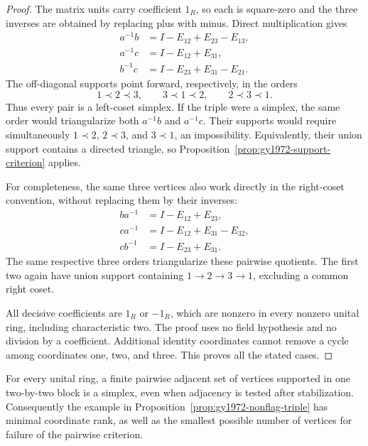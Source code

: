 \begin{proof}
The matrix units carry coefficient \(1_R\), so each is square-zero and
the three inverses are obtained by replacing plus with minus. Direct
multiplication gives
\[
\begin{aligned}
 a^{-1}b&=I-E_{12}+E_{23}-E_{13},\\
 a^{-1}c&=I-E_{12}+E_{31},\\
 b^{-1}c&=I-E_{23}+E_{31}-E_{21}.
\end{aligned}
\]
The off-diagonal supports point forward, respectively, in the orders
\[
             1\prec2\prec3,\qquad
             3\prec1\prec2,\qquad
             2\prec3\prec1.
\]
Thus every pair is a left-coset simplex. If the triple were a simplex,
the same order would triangularize both \(a^{-1}b\) and \(a^{-1}c\).
Their supports would require simultaneously
\(1\prec2\), \(2\prec3\), and \(3\prec1\), an impossibility.
Equivalently, their union support contains a directed triangle, so
Proposition~\ref{prop:gy1972-support-criterion} applies.

For completeness, the same three vertices also work directly in the
right-coset convention, without replacing them by their inverses:
\[
\begin{aligned}
 ba^{-1}&=I-E_{12}+E_{23},\\
 ca^{-1}&=I-E_{12}+E_{31}-E_{32},\\
 cb^{-1}&=I-E_{23}+E_{31}.
\end{aligned}
\]
The same respective three orders triangularize these pairwise
quotients. The first two again have union support containing
\(1\to2\to3\to1\), excluding a common right coset.

All decisive coefficients are \(1_R\) or \(-1_R\), which are nonzero
in every nonzero unital ring, including characteristic two. The proof
uses no field hypothesis and no division by a coefficient. Additional
identity coordinates cannot remove a cycle among coordinates one,
two, and three. This proves all the stated cases.
\end{proof}

\begin{proposition}\ours
\label{prop:gy1972-rank-minimal}
For every unital ring, a finite pairwise adjacent set of vertices
supported in one two-by-two block is a simplex, even when adjacency is
tested after stabilization. Consequently the example in
Proposition~\ref{prop:gy1972-nonflag-triple} has minimal coordinate rank,
as well as the smallest possible number of vertices for failure of the
pairwise criterion.
\end{proposition}

